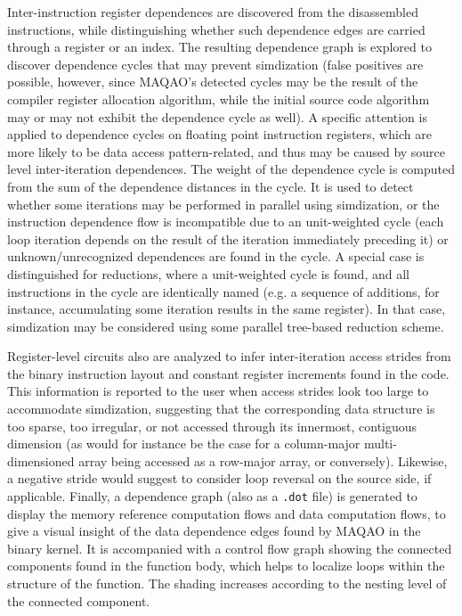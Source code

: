\documentclass[11pt, a4paper, twoside]{montblanc2}
\begin{document}
Inter-instruction register dependences are discovered from the disassembled 
instructions, while distinguishing whether such dependence edges are carried 
through a register or an index. The resulting dependence graph is explored to 
discover dependence cycles that may prevent simdization (false positives are 
possible, however, since MAQAO's detected cycles may be the result of the 
compiler register allocation algorithm, while the initial source code algorithm 
may or may not exhibit the dependence cycle as well). A specific attention is 
applied to dependence cycles on floating point instruction registers, which are 
more likely to be data access pattern-related, and thus may be caused by source 
level inter-iteration dependences. The weight of the dependence cycle is 
computed from the sum of the dependence distances in the cycle. It is used to 
detect whether some iterations may be performed in parallel using simdization, 
or the instruction dependence flow is incompatible due to an unit-weighted cycle 
(each loop iteration depends on the result of the iteration immediately 
preceding it) or unknown/unrecognized dependences are found in the cycle. A special case is 
distinguished for reductions, where a unit-weighted cycle is found, and all
instructions in the cycle are identically named (e.g. a sequence of additions, 
for instance, accumulating some iteration results in the same register). In that 
case, simdization may be considered using some parallel tree-based reduction 
scheme.

Register-level circuits also are analyzed to infer inter-iteration access 
strides from the binary instruction layout and constant register increments 
found in the code. This information is reported to the user when access strides 
look too large to accommodate simdization, suggesting that the corresponding data 
structure is too sparse, too irregular, or not accessed through its innermost, 
contiguous dimension (as would for instance be the case for a column-major 
multi-dimensioned array being accessed as a row-major array, or conversely). 
Likewise, a negative stride would suggest to consider loop reversal on the 
source side, if applicable. Finally, a dependence graph (also as a \verb|.dot| 
file) is generated to display the memory reference computation flows and data 
computation flows, to give a visual insight of the data dependence edges found 
by MAQAO in the binary kernel. It is accompanied with a control flow graph 
showing the connected components found in the function body, which helps to localize 
loops within the structure of the function. The shading increases according to 
the nesting level of the connected component.
\end{document}
